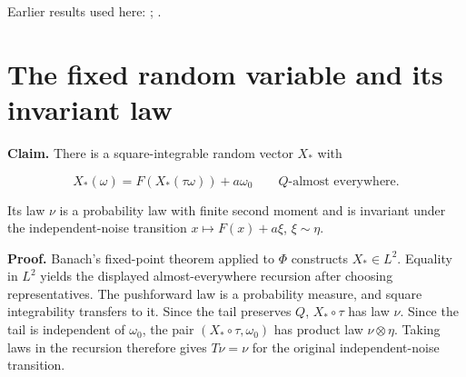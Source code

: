 \documentclass[11pt,a4paper]{article}
\begin{document}
Earlier results used here: \cite[Section~3.13.2]{LangevinLean2026ULASC}; \cite[Section~3.13.5]{LangevinLean2026ULASC}.

\section{\texorpdfstring{The fixed random variable and its invariant law}{The fixed random variable and its invariant law}}


\textbf{Claim.} There is a square-integrable random vector \(X_*\) with

\[X_*(\omega)=F(X_*(\tau\omega))+a\omega_0\qquad Q\text{-almost everywhere}.\]


Its law \(\nu\) is a probability law with finite second moment and is invariant under the independent-noise transition \(x\mapsto F(x)+a\xi\), \(\xi\sim\eta\).




\textbf{Proof.} Banach's fixed-point theorem applied to \(\Phi\) constructs \(X_*\in L^2\). Equality in \(L^2\) yields the displayed almost-everywhere recursion after choosing representatives. The pushforward law is a probability measure, and square integrability transfers to it. Since the tail preserves \(Q\), \(X_*\circ\tau\) has law \(\nu\). Since the tail is independent of \(\omega_0\), the pair \((X_*\circ\tau,\omega_0)\) has product law \(\nu\otimes\eta\). Taking laws in the recursion therefore gives \(T\nu=\nu\) for the original independent-noise transition.
\end{document}
